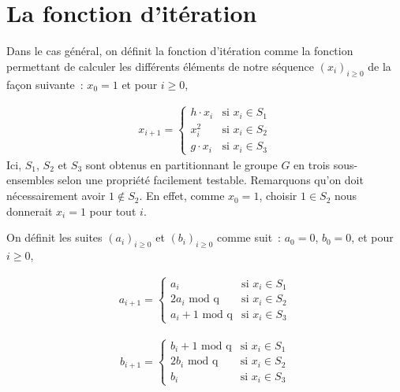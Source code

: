         \section{La fonction d'itération}
        Dans le cas général, on définit la fonction d'itération comme la fonction permettant de calculer les différents éléments de notre séquence $(x_i)_{i \ge 0}$ de la façon suivante~: $x_0 = 1$ et pour $i \geq 0$,

        \begin{align*}
          x_{i+1} =
          \begin{cases}
            h \cdot x_i & \text{si } x_i \in S_1 \\
            x_i^2 & \text{si } x_i \in S_2 \\
            g \cdot x_i & \text{si } x_i \in S_3
          \end{cases}
        \end{align*}
        Ici, $S_1$, $S_2$ et $S_3$ sont obtenus en partitionnant le groupe $G$ en trois sous-ensembles selon une propriété facilement testable. Remarquons qu'on doit nécessairement avoir $1 \notin S_2$. En effet, comme $x_0 = 1$, choisir $1 \in S_2$ nous donnerait $x_i = 1$ pour tout $i$.

        On définit les suites ${(a_i)}_{i \geq 0}$ et ${(b_i)}_{i \geq 0}$ comme suit~: $a_0 = 0$, $b_0 = 0$, et pour $i \geq 0$,

        \begin{align*}
          a_{i+1} =
          \begin{cases}
            a_i                   & \text{si } x_i \in S_1 \\
            2a_i \text{\ mod q}    & \text{si } x_i \in S_2 \\
            a_i + 1 \text{\ mod q} & \text{si } x_i \in S_3
          \end{cases}
        \end{align*}

        \begin{align*}
          b_{i+1} =
          \begin{cases}
            b_i + 1 \text{\ mod q} & \text{si } x_i \in S_1 \\
            2b_i \text{\ mod q}    & \text{si } x_i \in S_2 \\
            b_i                   & \text{si } x_i \in S_3
          \end{cases}
        \end{align*}

